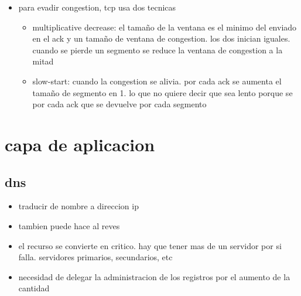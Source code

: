 \documentclass[11pt]{article}
\begin{document}
\begin{itemize}
\begin{itemize}
\end{itemize}
\item para evadir congestion, tcp usa dos tecnicas
\begin{itemize}
\item multiplicative decrease: el tamaño de la ventana es el minimo del enviado en el ack y un tamaño de ventana de congestion. los dos inician iguales. cuando se pierde un segmento se reduce la ventana de congestion a la mitad
\item slow-start: cuando la congestion se alivia. por cada ack se aumenta el tamaño de segmento en 1. lo que no quiere decir que sea lento porque se por cada ack que se devuelve por cada segmento
\end{itemize}
\end{itemize}
\section{capa de aplicacion}
\label{sec:org46142a1}
\subsection{dns}
\label{sec:org9dee915}
\begin{itemize}
\item traducir de nombre a direccion ip
\item tambien puede hace al reves
\item el recurso se convierte en critico. hay que tener mas de un servidor por si falla. servidores primarios, secundarios, etc
\item necesidad de delegar la administracion de los registros por el aumento de la cantidad
\end{itemize}
\end{document}

